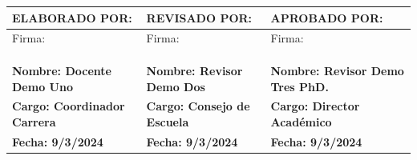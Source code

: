 
\noindent
\begin{tabularx}{\textwidth}{|X|X|X|}
    \hline
    \textbf{ELABORADO POR:} & \textbf{REVISADO POR:} & \textbf{APROBADO POR:} \\ \hline
    Firma: & Firma: & Firma:\\
    &&\\
    &&\\
    &&\\ \hline
    \textbf{Nombre: Docente Demo Uno} & \textbf{Nombre: Revisor Demo Dos} & \textbf{Nombre: Revisor Demo Tres PhD.} \\ \hline
    \textbf{Cargo: Coordinador Carrera} & \textbf{Cargo: Consejo de Escuela} & \textbf{Cargo: Director Académico} \\ \hline
    \textbf{Fecha: 9/3/2024} & \textbf{Fecha: 9/3/2024} & \textbf{Fecha: 9/3/2024} \\ \hline
\end{tabularx}